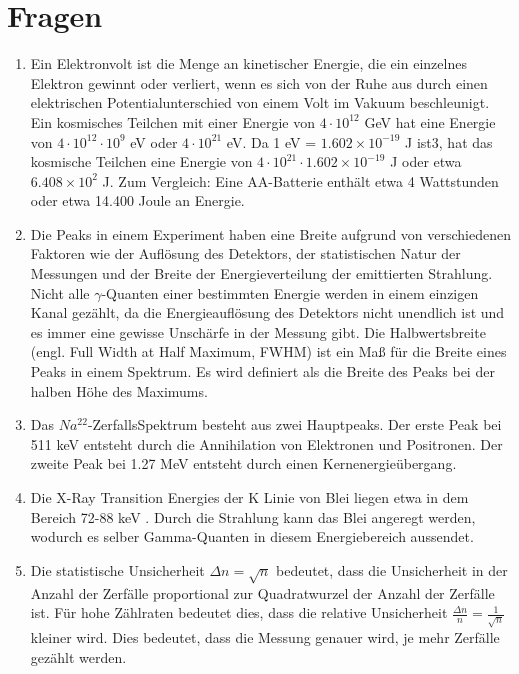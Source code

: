 \documentclass[11pt, a4paper]{article}
\begin{document}
    \section{Fragen}
    \begin{enumerate}
        \item Ein Elektronvolt ist die Menge an kinetischer Energie, die ein einzelnes Elektron gewinnt oder verliert, wenn es sich von der Ruhe aus durch einen elektrischen Potentialunterschied von einem Volt im Vakuum beschleunigt.
        Ein kosmisches Teilchen mit einer Energie von $4 \cdot 10^{12}$ GeV hat eine Energie von $4 \cdot 10^{12} \cdot 10^9$ eV oder $4 \cdot 10^{21}$ eV. Da 1 eV = $1.602 \times 10^{-19}$ J ist3, hat das kosmische Teilchen eine Energie von $4 \cdot 10^{21} \cdot 1.602 \times 10^{-19}$ J oder etwa $6.408 \times 10^2$ J.        
        Zum Vergleich: Eine AA-Batterie enthält etwa 4 Wattstunden oder etwa 14.400 Joule an Energie.
        \item Die Peaks in einem Experiment haben eine Breite aufgrund von verschiedenen Faktoren wie der Auflösung des Detektors, der statistischen Natur der Messungen und der Breite der Energieverteilung der emittierten Strahlung.
        Nicht alle $\gamma$-Quanten einer bestimmten Energie werden in einem einzigen Kanal gezählt, da die Energieauflösung des Detektors nicht unendlich ist und es immer eine gewisse Unschärfe in der Messung gibt.
        Die Halbwertsbreite (engl. Full Width at Half Maximum, FWHM) ist ein Maß für die Breite eines Peaks in einem Spektrum. Es wird definiert als die Breite des Peaks bei der halben Höhe des Maximums.
        \item Das $Na^{22}$-ZerfallsSpektrum besteht aus zwei Hauptpeaks. Der erste Peak bei 511 keV entsteht durch die Annihilation von Elektronen und Positronen. Der zweite Peak bei 1.27 MeV entsteht durch einen Kernenergieübergang.
        \item Die X-Ray Transition Energies der K Linie von Blei liegen etwa in dem Bereich 72-88 keV \cite{blei}. Durch die Strahlung kann das Blei angeregt werden, wodurch es selber Gamma-Quanten in diesem Energiebereich aussendet.
        \item Die statistische Unsicherheit $\Delta n = \sqrt{n}$ bedeutet, dass die Unsicherheit in der Anzahl der Zerfälle proportional zur Quadratwurzel der Anzahl der Zerfälle ist. Für hohe Zählraten bedeutet dies, dass die relative Unsicherheit $\frac{\Delta n}{n} = \frac{1}{\sqrt{n}}$ kleiner wird. Dies bedeutet, dass die Messung genauer wird, je mehr Zerfälle gezählt werden.

\end{enumerate}
\end{document}

